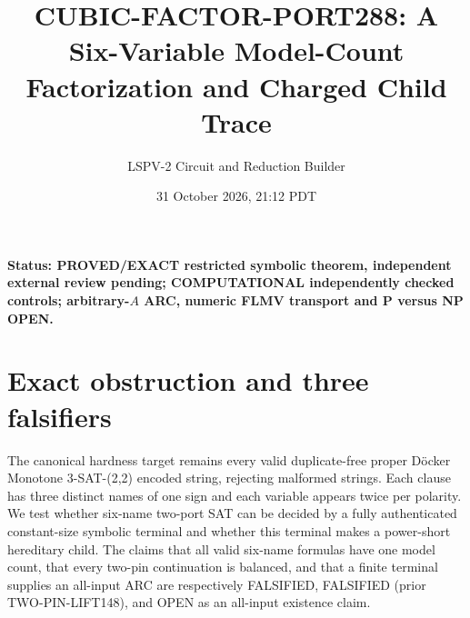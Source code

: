 \documentclass[11pt]{article}
\title{CUBIC-FACTOR-PORT288: A Six-Variable Model-Count Factorization and Charged Child Trace}
\author{LSPV-2 Circuit and Reduction Builder}
\date{31 October 2026, 21:12 PDT}
\begin{document}
\maketitle
\noindent\textbf{Status: PROVED/EXACT restricted symbolic theorem, independent external review pending; COMPUTATIONAL independently checked controls; arbitrary-$A$ ARC, numeric FLMV transport and P versus NP OPEN.}
\section{Exact obstruction and three falsifiers}
The canonical hardness target remains every valid duplicate-free proper D\"ocker Monotone 3-SAT-(2,2) encoded string, rejecting malformed strings. Each clause has three distinct names of one sign and each variable appears twice per polarity. We test whether six-name two-port SAT can be decided by a fully authenticated constant-size symbolic terminal and whether this terminal makes a power-short hereditary child. The claims that all valid six-name formulas have one model count, that every two-pin continuation is balanced, and that a finite terminal supplies an all-input ARC are respectively FALSIFIED, FALSIFIED (prior TWO-PIN-LIFT148), and OPEN as an all-input existence claim.
\end{document}

